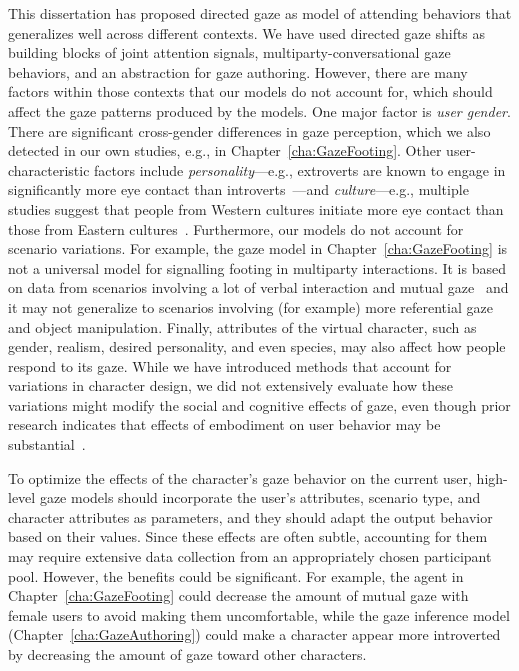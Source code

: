 This dissertation has proposed directed gaze as model of attending behaviors that generalizes well across different contexts. We have used directed gaze shifts as building blocks of joint attention signals, multiparty-conversational gaze behaviors, and an abstraction for gaze authoring. However, there are many factors within those contexts that our models do not account for, which should affect the gaze patterns produced by the models. One major factor is \emph{user gender}. There are significant cross-gender differences in gaze perception, which we also detected in our own studies, e.g., in Chapter~\ref{cha:GazeFooting}. Other user-characteristic factors include \emph{personality}---e.g., extroverts are known to engage in significantly more eye contact than introverts~\citep{rutter1972visual}---and \emph{culture}---e.g., multiple studies suggest that people from Western cultures initiate more eye contact than those from Eastern cultures~\citep{mccarthy2006cultural,mccarthy2008gaze}. Furthermore, our models do not account for scenario variations. For example, the gaze model in Chapter~\ref{cha:GazeFooting} is not a universal model for signalling footing in multiparty interactions. It is based on data from scenarios involving a lot of verbal interaction and mutual gaze~\citep{mutlu2012conversational} and it may not generalize to scenarios involving (for example) more referential gaze and object manipulation. Finally, attributes of the virtual character, such as gender, realism, desired personality, and even species, may also affect how people respond to its gaze. While we have introduced methods that account for variations in character design, we did not extensively evaluate how these variations might modify the social and cognitive effects of gaze, even though prior research indicates that effects of embodiment on user behavior may be substantial~\citep{parise1996my}.

To optimize the effects of the character's gaze behavior on the current user, high-level gaze models should incorporate the user's attributes, scenario type, and character attributes as parameters, and they should adapt the output behavior based on their values. Since these effects are often subtle, accounting for them may require extensive data collection from an appropriately chosen participant pool. However, the benefits could be significant. For example, the agent in Chapter~\ref{cha:GazeFooting} could decrease the amount of mutual gaze with female users to avoid making them uncomfortable, while the gaze inference model (Chapter~\ref{cha:GazeAuthoring}) could make a character appear more introverted by decreasing the amount of gaze toward other characters.

